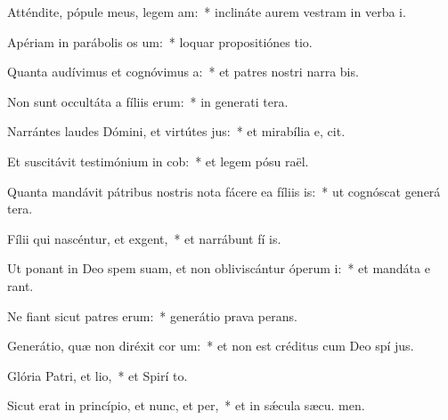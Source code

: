 \item Atténdite, pópule meus, legem am:~* inclináte aurem vestram in verba  i.
\item Apériam in parábolis os um:~* loquar propositiónes  tio.
\item Quanta audívimus et cognóvimus a:~* et patres nostri narra bis.
\item Non sunt occultáta a fíliis erum:~* in generati tera.
\item Narrántes laudes Dómini, et virtútes jus:~* et mirabília e,  cit.
\item Et suscitávit testimónium in cob:~* et legem pósu  raël.
\item Quanta mandávit pátribus nostris nota fácere ea fíliis is:~* ut cognóscat generá tera.
\item Fílii qui nascéntur, et exgent,~* et narrábunt fí is.
\item Ut ponant in Deo spem suam, et non obliviscántur óperum i:~* et mandáta e rant.
\item Ne fiant sicut patres erum:~* generátio prava  perans.
\item Generátio, quæ non diréxit cor um:~* et non est créditus cum Deo spí jus.
\item Glória Patri, et lio,~* et Spirí to.
\item Sicut erat in princípio, et nunc, et per,~* et in sǽcula sæcu. men.
